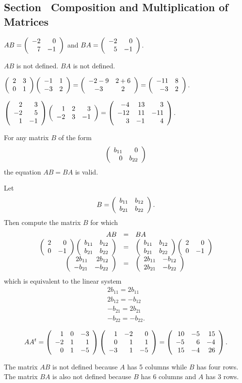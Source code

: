 \documentclass{ximera}
\begin{document}
\subsection*{Section~\protect{\ref{S:4.6}} Composition and Multiplication
of Matrices}

 $AB=\left(\begin{array}{rr} -2 & 0\\ 7 &-1\end{array}\right)$ and $BA= \left(\begin{array}{rr} -2 & 0\\ 5 &-1\end{array}\right)$.

 $AB$ is not defined.  $BA$ is not defined.  

$\left(\begin{array}{rr} 2 & 3\\ 0 &1\end{array}\right)\left(\begin{array}{rr} -1 & 1\\ -3 &2\end{array}\right) =
\left(\begin{array}{cc} -2 - 9 & 2+6\\ -3 &2\end{array}\right) = \left(\begin{array}{rr} -11 & 8\\ -3 &2\end{array}\right)$.

 $\left(\begin{array}{rr} 2 & 3\\ -2 & 5 \\1 & -1 \end{array}
\right) \left(\begin{array}{rrr} 1 & 2 & 3\\ -2 & 3 & -1 \end{array}\right)
= \left(\begin{array}{rrr} -4 & 13 & 3 \\ -12 & 11 & -11 \\ 3 & -1 & 4\end{array}\right)$.

\ans For any matrix $B$ of the form
\[
\left(\begin{array}{rr} b_{11} & 0\\ 0 &b_{22}\end{array}\right)
\]
the equation $AB = BA$ is valid.

\soln Let
\[
B = \left(\begin{array}{rr} b_{11} & b_{12}\\ b_{21} &b_{22}\end{array}\right).
\]
Then compute the matrix $B$ for which
\[
\begin{array}{rcl}
AB & = & BA \\
\left(\begin{array}{rr} 2 & 0\\ 0 &-1\end{array}\right)\left(\begin{array}{rr} b_{11} & b_{12}\\ b_{21} &b_{22}\end{array}\right) &
= & \left(\begin{array}{rr} b_{11} & b_{12}\\ b_{21} &b_{22}\end{array}\right)\left(\begin{array}{rr} 2 & 0\\ 0 &-1\end{array}\right) \\
\left(\begin{array}{rr} 2b_{11} & 2b_{12}\\ -b_{21} &-b_{22}\end{array}\right) & = &
\left(\begin{array}{rr} 2b_{11} & -b_{12}\\ 2b_{21} &-b_{22}\end{array}\right) \end{array}
\]
which is equivalent to the linear system
\[
\begin{array}{l}
2b_{11} = 2b_{11} \\
2b_{12} = -b_{12} \\
-b_{21} = 2b_{21} \\
-b_{22} = -b_{22}. \end{array}
\]

\[ AA^t = \left(\begin{array}{rrr} 1 & 0 & -3 \\ -2 & 1 & 1 \\ 0 & 1 & -5\end{array}\right)
\left(\begin{array}{rrr} 1 & -2 & 0 \\ 0 & 1 & 1 \\ -3 & 1 & -5\end{array}\right) =
\left(\begin{array}{rrr} 10 & -5 & 15 \\ -5 & 6 & -4 \\ 15 & -4 & 26\end{array}\right). \]

 The matrix $AB$ is not defined because $A$ has 5 columns
while $B$ has four rows.  The matrix $BA$ is also not defined
because $B$ has 6 columns and $A$ has 3 rows.
\end{document}
